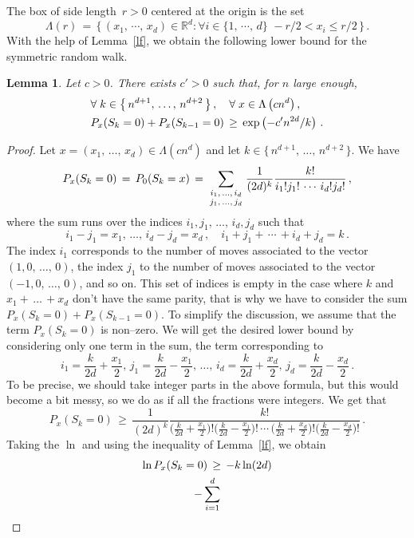 \documentclass[10pt]{amsart}
\newtheorem{lemm}[theo]{Lemma}\newtheorem{prop}[theo]{Proposition}\newtheorem{coro}[theo]{Corollary}\newtheorem{conj}[theo]{Conjecture}
\theoremstyle{definition}\newtheorem{defi}[theo]{Definition}\newtheorem{rema}[theo]{Remark}\newtheorem{exam}[theo]{Example}\newtheorem{exem}[theo]{Example}\newtheorem{nota}[theo]{Notation}
\newcommand{\tatop}[2]{\genfrac{}{}{0pt}{1}{#1}{#2}}
\newcommand*\R{\mathbb{R}}
\newcommand*\La {{\Lambda}}
\let\oldforall\forall
\renewcommand*{\forall}{\mathrel{\oldforall}}
\begin{document}
The box of side length~$r>0$ centered at the origin is the set
\[
\Lambda(r) \,=\, \big\{\,(x_1,\,\cdots,\,x_d)\in\R^d :
\forall i\in \{1,\,\cdots,\,d\}\,\, -r/2<x_i\leq r/2
\,\big\}\,.
\]
With the help of Lemma~\ref{lf}, we obtain the following lower bound for the symmetric random walk.
\begin{lemm}\label{afaire}
Let $c>0$. There exists $c'>0$ such that, for $n$ large enough,
\begin{multline*}
\forall k\in\left\{\,n^{d+1},\,\dots,\,n^{d+2}\,\right\},\quad
\forall x\in\La\left(cn^d\right),\quad\hfill\\ P_x(S_{k}=0)+ P_x(S_{k-1}=0)\,\geq\,\exp\left(-c'n^{2d}/k\right)\,.
\end{multline*}
\end{lemm}
\begin{proof}
Let $x=(x_1,\,\dots,\,x_d)\in \La(cn^d)$ and let $k\in\{\,n^{d+1},\,\dots,\,n^{d+2}\,\}$. We have
\[
P_x(S_{k}=0)\,=\,
P_0(S_{k}=x)\,=\,
\sum_{
\tatop{{i_1,\,\dots,\,i_d} } {{j_1,\,\dots,\,j_d} } }
\frac{1}{(2d)^k}
\frac{k!}{i_1!j_1!\,\cdots\,i_d!j_d!}
\,,
\]
where the sum runs over the indices $i_1,j_1,\,\dots,\,i_d,j_d$ such that
\[
i_1-j_1=x_1,\,\dots,\,i_d-j_d=x_d\,,\quad
i_1+j_1+\,\cdots\,+i_d+j_d=k\,.
\]
The index $i_1$ corresponds to the number of moves associated to the vector $(1,0,\,\dots,\,0)$, the index $j_1$ to the number of moves associated to the vector $(-1,0,\,\dots,\,0)$, and so on. This set of indices is empty in the case where $k$ and $x_1+\,\dots\,+x_d$ don't have the same parity, that is why we have to consider the sum $P_x(S_{k}=0)+ P_x(S_{k-1}=0)$. To simplify the discussion, we assume that the term $P_x(S_{k}=0)$ is non--zero. We will get the desired lower bound by considering only one term in the sum, the term corresponding to
\[
i_1=\frac{k}{2d}+\frac{x_1}{2},\,
j_1=\frac{k}{2d}-\frac{x_1}{2},\,\dots,\, i_d=\frac{k}{2d}+\frac{x_d}{2},\,
j_d=\frac{k}{2d}-\frac{x_d}{2}\,.
\]
To be precise, we should take integer parts in the above formula, but this would become a bit messy, so we do as if all the fractions were integers. We get that
\[
P_x(S_{k}=0)\,\geq\,
\frac{1}{(2d)^k}
\frac{k!}{
\Big(\displaystyle \frac{k}{2d}+\frac{x_1}{2}\Big)!
\Big(\displaystyle \frac{k}{2d}-\frac{x_1}{2}\Big)!
\,\cdots\,
\Big(\frac{k}{2d}+\frac{x_d}{2}\Big)!
\Big(\frac{k}{2d}-\frac{x_d}{2}\Big)! }
\,.
\]
Taking the $\ln$ and using the inequality of Lemma~\ref{lf}, we obtain
\begin{multline*}
\ln P_x(S_{k}=0)\,\geq\,-k\ln (2d)\hfill\\ -\sum_{i=1}^d

\end{multline*}
\end{proof}
\end{document}
